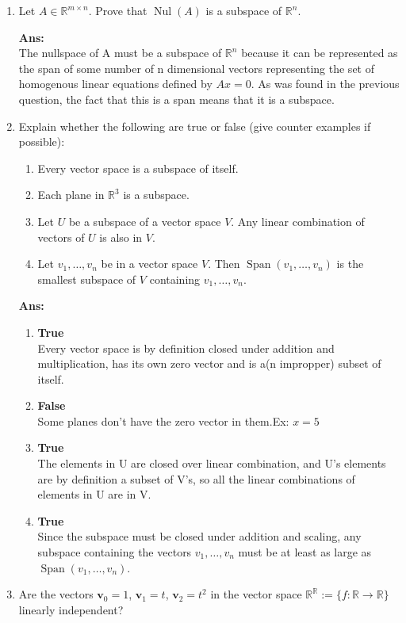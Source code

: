 \documentclass[12pt,oneside]{amsart}
\newcommand{\bv}{\mathbf{v}}
\newcommand{\R}{\mathbb{R}}
\newcommand\sol[1]{
\medskip
\begin{mdframed}
\textbf{Ans:\\} #1
\end{mdframed}
\medskip
}
\DeclareMathOperator{\Span}{Span}
\DeclareMathOperator{\Nul}{Nul}
\begin{document}
\begin{enumerate}
\item
Let $A\in\R^{m \times n}$.
Prove that $\Nul(A)$ is a subspace of $\R^n$.

\sol{
  The nullspace of A must be a subspace of $\R^n$ because it can be represented as the span of some number of n dimensional vectors representing the set of homogenous linear equations defined by $Ax=0$.
  As was found in the previous question, the fact that this is a span means that it is a subspace.
}


\item Explain whether the following are true or false (give counter examples if possible):
\begin{enumerate}
\item  
 Every vector space is a subspace of itself.
\item
 Each plane in $\R^3$ is a subspace.
\item
 Let $U$ be a subspace of a vector space $V$. Any linear combination of vectors of $U$ is also in $V$.
\item
 Let $v_1,\dots, v_n$ be in a vector space $V$. Then $\Span(v_1,\dots, v_n)$ is the smallest subspace of $V$
 containing $v_1,\dots, v_n$. 
\end{enumerate}

\sol{
  \begin{enumerate}
    \item \textbf{True}\\
      Every vector space is by definition closed under addition and multiplication, has its own zero vector and is a(n impropper) subset of itself.
    \item \textbf{False}\\
      Some planes don't have the zero vector in them.Ex: $x=5$
    \item \textbf{True}\\
      The elements in U are closed over linear combination, and U's elements are by definition a subset of V's, so all the linear combinations of elements in U are in V.
    \item \textbf{True}\\
      Since the subspace must be closed under addition and scaling, any subspace containing the vectors $v_1,\dots, v_n$ must be at least as large as $\Span(v_1,\dots, v_n)$.
  \end{enumerate}
}


\item Are the vectors $\bv_0 = 1$, $\bv_1 = t$, $\bv_2 =t^2$ in the vector space $\R^\R := \{ f \colon \R \to \R \}$ linearly independent?


\end{enumerate}
\end{document}
